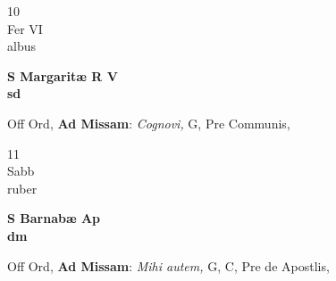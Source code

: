 \documentclass[10pt, openany]{book}
\begin{document}
        \begin{center}
            \begin{minipage}{3.5in}
                \vspace{2em}
                \begin{minipage}{0.5in}
                    {\Huge 10} \\
                    {\normalsize Fer VI} \\
                    {\normalsize albus}
                \end{minipage}
                \begin{minipage}{3.0in}
                    \textbf{ \large S Margaritæ R V \\
                    \textnormal{\normalsize sd}} \\ 
                \end{minipage}
                \begin{justify}Off Ord, \textbf{Ad Missam}: \textit{Cognovi,} G, Pre Communis,   
                \end{justify}
            \end{minipage}
        \end{center}
    
        \begin{center}
            \begin{minipage}{3.5in}
                \vspace{2em}
                \begin{minipage}{0.5in}
                    {\Huge 11} \\
                    {\normalsize Sabb} \\
                    {\normalsize ruber}
                \end{minipage}
                \begin{minipage}{3.0in}
                    \textbf{ \large S Barnabæ Ap \\
                    \textnormal{\normalsize dm}} \\ 
                \end{minipage}
                \begin{justify}Off Ord, \textbf{Ad Missam}: \textit{Mihi autem,} G, C, Pre de Apostlis,   
                \end{justify}
            \end{minipage}
        \end{center}
    
\end{document}
